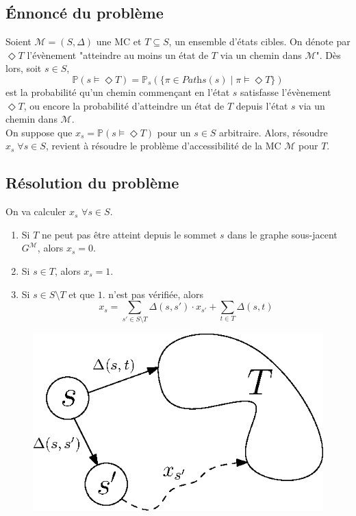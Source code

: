\documentclass[12pt,a4paper]{report}
\theoremstyle{definition}%
\theoremstyle{remark}
\begin{document}
\subsection{\'Ennoncé du problème}
Soient $\mathcal{M} = (S, \Delta)$ une MC et $T \subseteq S$, un ensemble d'états cibles. On dénote par $\Diamond T$ l'évènement "atteindre au moins un état de $T$ via un chemin dans $\mathcal{M}$". Dès lors, soit $s \in S$, \[\mathbb{P}(s \models \Diamond T) = \mathbb{P}_s(\{\pi \in \textit{Paths}(s) \; | \; \pi \models \Diamond T\})\] est la probabilité qu'un chemin commençant en l'état $s$ satisfasse l'évènement $\Diamond T$, ou encore la probabilité d'atteindre un état de $T$ depuis l'état $s$ via un chemin dans $\mathcal{M}$.\\
On suppose que $x_s = \mathbb{P}(s \models \Diamond T)$ pour un $s \in S$ arbitraire. Alors, résoudre $x_s \; \forall s\in S$, revient à résoudre le problème d'accessibilité de la MC $\mathcal{M}$ pour $T$.

\subsection{Résolution du problème}
On va calculer $x_s$ $ \forall s \in S$.
\begin{enumerate}
	\item Si $T$ ne peut pas être atteint depuis le sommet $s$ dans le graphe sous-jacent $G^\mathcal{M}$, alors $x_s = 0$.
	\item Si $s \in T$, alors $x_s = 1$.
	\item Si $s \in S \setminus T$ et que $1.$ n'est pas vérifiée, alors 
		\[ x_s = \sum_{s' \in S \setminus T} \Delta(s, s') \cdot x_{s'} + \sum_{t \in T} \Delta(s, t) \]
\end{enumerate}

\begin{figure}[H]
	\centering
	\includegraphics[scale=0.6]{figures/reachability.eps}
	\label{reachablity}
\end{figure}
\end{document}
